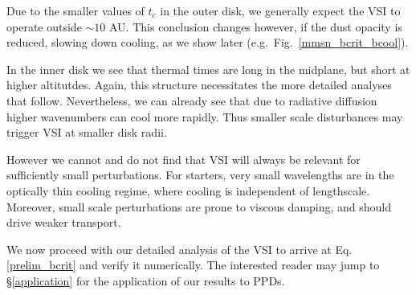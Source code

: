 \documentclass[iop]{emulateapj}
\begin{document}
Due to the smaller values of $t_c$ in the outer disk, we generally expect the VSI to 
operate outside $\sim 10$ AU.  This conclusion changes however, if the dust opacity is reduced, 
slowing down cooling, as we show later (e.g.\ Fig.\ \ref{mmsn_bcrit_bcool}).

In the inner disk we see that thermal times are long in the midplane, but short at higher altitutdes. 
Again, this structure necessitates the more detailed analyses that follow.  Nevertheless, we can already 
see that due to radiative diffusion higher wavenumbers can cool more rapidly.  Thus smaller scale disturbances 
may trigger VSI at smaller disk radii.

However we cannot and do not find that VSI will 
always be relevant for sufficiently small perturbations.  For starters, very small wavelengths are in the optically 
thin cooling regime,  where cooling is independent of lengthscale.  Moreover, small scale perturbations 
are prone to viscous damping, and should drive weaker transport.

We now proceed with our detailed analysis of the VSI to arrive
at Eq. \ref{prelim_bcrit} and verify it numerically. The interested 
reader may jump to \S\ref{application} for the application of our
results to PPDs.     





 


\appendix




\end{document}
